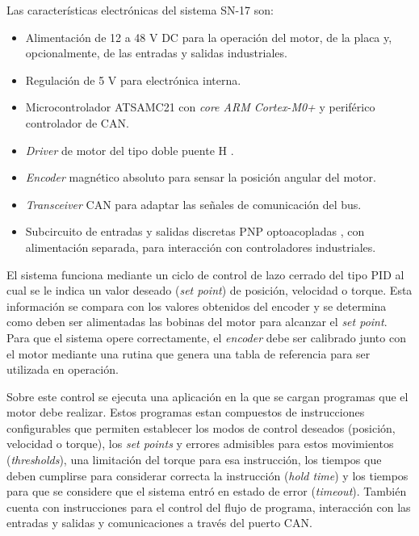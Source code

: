 
Las características electrónicas del sistema SN-17 son:

\begin{itemize}
	\item Alimentación de 12 a 48 V DC para la operación del motor, de la placa y, opcionalmente, de las entradas y salidas industriales.
	\item Regulación de 5 V para electrónica interna.
	\item Microcontrolador ATSAMC21 \citep{web_ATSAMC21G18A} con \textit{core ARM Cortex-M0+} y periférico controlador de CAN.
	\item \textit{Driver} de motor del tipo doble puente H \citep{web_A4954}.
	\item \textit{Encoder} magnético absoluto \citep{web_AS5047D} para sensar la posición angular del motor.
	\item \textit{Transceiver} CAN para adaptar las señales de comunicación del bus.
	\item Subcircuito de entradas y salidas discretas PNP optoacopladas \citep{web_optoacopladores_LTV}, con alimentación separada, para interacción con controladores industriales.
\end{itemize}

El sistema funciona mediante un ciclo de control de lazo cerrado del tipo PID \citep{paper_PID_steppers} al cual se le indica un valor deseado (\textit{set point}) de posición, velocidad o torque. Esta información se compara con los valores obtenidos del encoder y se determina como deben ser alimentadas las bobinas del motor para alcanzar el \textit{set point}. Para que el sistema opere correctamente, el \textit{encoder} debe ser calibrado junto con el motor mediante una rutina que genera una tabla de referencia para ser utilizada en operación.

Sobre este control se ejecuta una aplicación en la que se cargan programas que el motor debe realizar. Estos programas estan compuestos de instrucciones configurables que permiten establecer los modos de control deseados (posición, velocidad o torque), los \textit{set points} y errores admisibles para estos movimientos (\textit{thresholds}), una limitación del torque para esa instrucción, los tiempos que deben cumplirse para considerar correcta la instrucción (\textit{hold time}) y los tiempos para que se considere que el sistema entró en estado de error (\textit{timeout}). También cuenta con instrucciones para el control del flujo de programa, interacción con las entradas y salidas y comunicaciones a través del puerto CAN.

